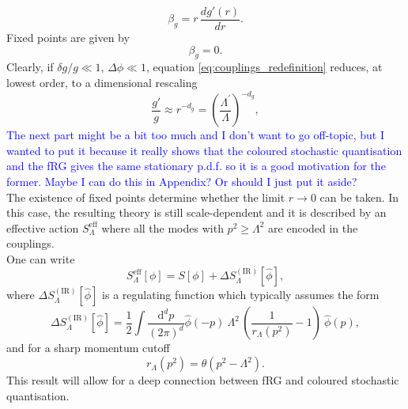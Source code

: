 \begin{equation*}
    \beta_g = r \, \frac{dg'(r)}{dr}.
\end{equation*}
Fixed points are given by 
\begin{equation*}
    \beta_g = 0.
\end{equation*}
Clearly, if $\delta g / g \ll 1$, $\Delta \phi \ll 1$, equation \eqref{eq:couplings_redefinition} reduces, at lowest order, to a dimensional rescaling
\begin{equation*}
    \frac{g'}{g} \approx r^{-d_g} = \left(\frac{\Lambda^\prime}{\Lambda}\right)^{-d_g},
\end{equation*}
\textcolor{blue}{The next part might be a bit too much and I don't want to go off-topic, but I wanted to put it because it really shows that the coloured stochastic quantisation and the fRG gives the same stationary p.d.f. so it is a good motivation for the former. Maybe I can do this in Appendix? Or should I just put it aside? \\}
The existence of fixed points determine whether the limit $r \to 0$ can be taken. In this case, the resulting theory is still scale-dependent and it is described by an effective action $S^\text{eff}_\Lambda$ where all the modes with $p^2 \geq \Lambda^2$ are encoded in the couplings. \\
One can write 
\begin{equation*}
    S^\text{eff}_\Lambda[\phi] = S[\phi] + \Delta S_{\Lambda}^{(\mathrm{IR})}[\hat{\phi}],
\end{equation*}
where $\Delta S_{\Lambda}^{(\mathrm{IR})}[\hat{\phi}]$ is a regulating function which typically assumes the form
\begin{equation} 
    \Delta S_{\Lambda}^{(\mathrm{IR})}[\hat{\phi}] = \frac{1}{2} \int \frac{\mathrm{d}^d p}{(2 \pi)^d} \hat{\phi}(-p) \ \Lambda^2 \, \left(\frac{1}{r_{\Lambda}(p^2)}-1\right) \ \hat{\phi}(p),
\end{equation}
and for a sharp momentum cutoff 
\begin{equation*}
    r_{\Lambda}(p^2) = \theta\left(p^2-\Lambda^2\right).
\end{equation*}
This result will allow for a deep connection between fRG and coloured stochastic quantisation.


